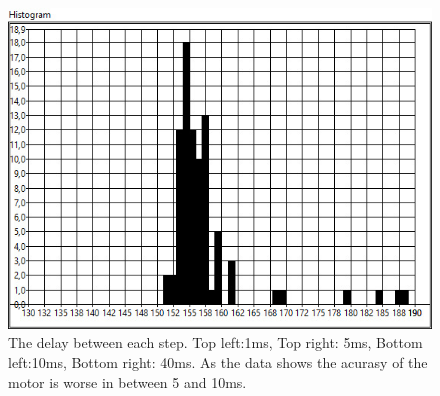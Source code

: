 \begin{figure}[ht]
        \includegraphics[scale=0.2] {./mesurment/data/Expected_160,0__Mean_156,97__Distrubution_6,850402_Rotating_40ms}
  \caption{The delay between each step. Top left:1ms, Top right: 5ms, Bottom left:10ms, Bottom right: 40ms. As the data shows the acurasy of the motor is worse in between 5 and 10ms.}
  \label{fig:test-hist}
\end{figure}


